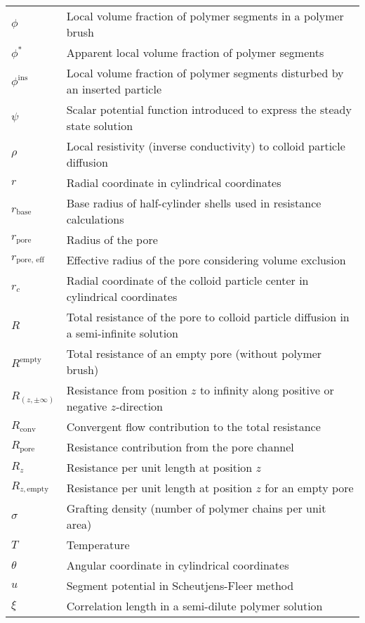 \documentclass[10pt, a4paper]{article}
\begin{document}
\begin{tabularx}{\linewidth}{l X}
    $\phi$ & Local volume fraction of polymer segments in a polymer brush \\
    $\phi^{\ast}$ & Apparent local volume fraction of polymer segments \\
    $\phi^{\textrm{ins}}$ & Local volume fraction of polymer segments disturbed by an inserted particle \\
    $\psi$ & Scalar potential function introduced to express the steady state solution \\
    $\rho$ & Local resistivity (inverse conductivity) to colloid particle diffusion \\
    $r$ & Radial coordinate in cylindrical coordinates \\
    $r_{\textrm{base}}$ & Base radius of half-cylinder shells used in resistance calculations\\
    $r_{\textrm{pore}}$ & Radius of the pore \\
    $r_{\textrm{pore, eff}}$ & Effective radius of the pore considering volume exclusion \\
    $r_{c}$ & Radial coordinate of the colloid particle center in cylindrical coordinates \\
    $R$ & Total resistance of the pore to colloid particle diffusion in a semi-infinite solution \\
    $R^{\textrm{empty}}$ & Total resistance of an empty pore (without polymer brush) \\
    $R_{(z, \pm\infty)}$ & Resistance from position $z$ to infinity along positive or negative $z$-direction \\
    $R_{\textrm{conv}}$ & Convergent flow contribution to the total resistance \\
    $R_{\textrm{pore}}$ & Resistance contribution from the pore channel \\
    $R_{z}$ & Resistance per unit length at position $z$ \\
    $R_{z, \textrm{empty}}$ & Resistance per unit length at position $z$ for an empty pore \\
    $\sigma$ & Grafting density (number of polymer chains per unit area) \\
    $T$ & Temperature \\
    $\theta$ & Angular coordinate in cylindrical coordinates \\
    $u$ & Segment potential in Scheutjens-Fleer method\\
    $\xi$ & Correlation length in a semi-dilute polymer solution \\

\end{tabularx}
\end{document}
